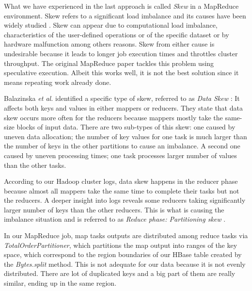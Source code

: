 What we have experienced in the last approach is called \textit{Skew} in a MapReduce environment. Skew refers to a significant load imbalance and its causes have been widely studied \cite{ananthanarayanan2010reining} \cite{dean2008mapreduce} \cite{walton1991taxonomy}. Skew can appear due to computational load imbalance, characteristics of the user-defined operations or of the specific dataset or by hardware malfunction among others reasons. Skew from either cause is undesirable because it leads to longer job execution times and throttles cluster throughput. The original MapReduce paper \cite{dean2008mapreduce} tackles this problem using speculative execution. Albeit this works well, it is not the best solution since it means repeating work already done.
\par
Balazinska \textit{et al.} identified a specific type of skew, referred to as \textit{Data Skew} \cite{kwon2013managing}: It affects both keys and values in either mappers or reducers. They state that data skew occurs more often for the reducers because mappers mostly take the same-size blocks of input data. There are two sub-types of this skew: one caused by uneven data allocation; the number of key values for one task is much larger than the number of keys in the other partitions to cause an imbalance. A second one caused by uneven processing times; one task processes larger number of values than the other tasks. 
\par
According to our Hadoop cluster logs, data skew happens in the reducer phase because almost all mappers take the same time to complete their tasks but not the reducers. A deeper insight into logs reveals some reducers taking significantly larger number of keys than the other reducers. This is what is causing the imbalance situation and is referred to as \textit{Reduce phase: Partitioning skew} \cite{kwon2012skewtune}.
\par
In our MapReduce job, map tasks outputs are distributed among reduce tasks via \textit{TotalOrderPartitioner}, which partitions the map output into ranges of the key space, which correspond to the region boundaries of our HBase table created by the \textit{Bytes.split} method. This is not adequate for our data because it is not evenly distributed. There are lot of duplicated keys and a big part of them are really similar, ending up in the same region.
\par
